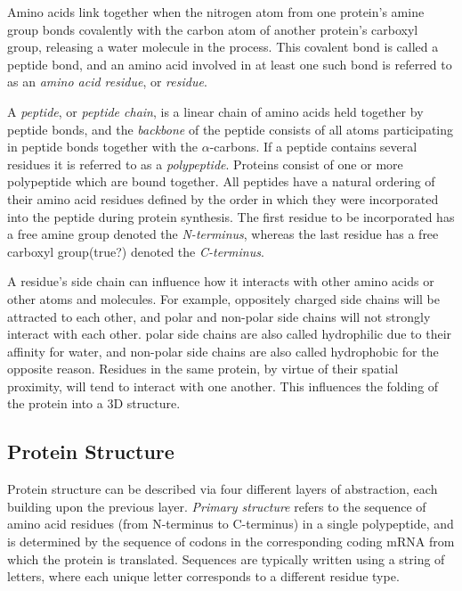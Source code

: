 Amino acids link together when the nitrogen atom from one protein's amine group bonds covalently with the carbon atom of another protein's carboxyl group, releasing a water molecule in the process.
This covalent bond is called a peptide bond, and an amino acid involved in at least one such bond is referred to as an \textit{amino acid residue}, or \textit{residue}.

A \textit{peptide}, or \textit{peptide chain}, is a linear chain of amino acids held together by peptide bonds, and the \textit{backbone} of the peptide consists of all atoms participating in peptide bonds together with the $\alpha$-carbons.
If a peptide contains several residues it is referred to as a \textit{polypeptide}.
Proteins consist of one or more polypeptide which are bound together.
All peptides have a natural ordering of their amino acid residues defined by the order in which they were incorporated into the peptide during protein synthesis.
The first residue to be incorporated has a free amine group denoted the \textit{N-terminus}, whereas the last residue has a free carboxyl group(true?) denoted the \textit{C-terminus}.


A residue's side chain can influence how it interacts with other amino acids or other atoms and molecules. For example, oppositely charged side chains will be attracted to each other, and polar and non-polar side chains will not strongly interact with each other. 
polar side chains are also called hydrophilic due to their affinity for water, and non-polar side chains are also called hydrophobic for the opposite reason.
Residues in the same protein, by virtue of their spatial proximity, will tend to interact with one another. 
This influences the folding of the protein into a 3D structure.



\subsection{Protein Structure}

Protein structure can be described via four different layers of abstraction, each building upon the previous layer. 
\textit{Primary structure} refers to the sequence of amino acid residues (from N-terminus to C-terminus) in a single polypeptide, and is determined by the sequence of codons in the corresponding coding mRNA from which the protein is translated.
Sequences are typically written using a string of letters, where each unique letter corresponds to a different residue type. 

